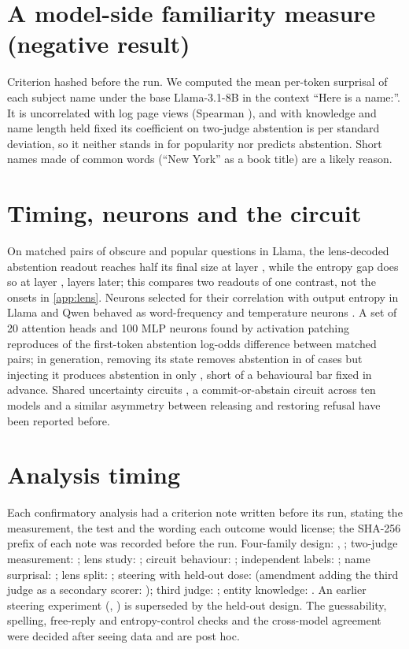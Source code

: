 \documentclass{article}
\begin{document}
\section{A model-side familiarity measure (negative result)}
\label{app:surprisal}

Criterion hashed before the run. We computed the mean per-token surprisal of each subject name under the base Llama-3.1-8B in the context ``Here is a name:''. It is uncorrelated with log page views (Spearman \esRho), and with knowledge and name length held fixed its coefficient on two-judge abstention is \esJudge{} \esJudgeCI{} per standard deviation, so it neither stands in for popularity nor predicts abstention. Short names made of common words (``New York'' as a book title) are a likely reason.

\section{Timing, neurons and the circuit}
\label{app:circuit}

On matched pairs of obscure and popular questions in Llama, the lens-decoded abstention readout reaches half its final size at layer \ltHedgeHalf, while the entropy gap does so at layer \ltEntHalf, \ltLead{} layers later; this compares two readouts of one contrast, not the onsets in \cref{app:lens}. Neurons selected for their correlation with output entropy in Llama and Qwen behaved as word-frequency and temperature neurons \citep{stolfo2024confidence,gurnee2024universal}. A set of 20 attention heads and 100 MLP neurons found by activation patching \citep{wang2023ioi,syed2023attribution} reproduces \ciRecovery{} \ciRecoveryCI{} of the first-token abstention log-odds difference between matched pairs; in generation, removing its state removes abstention in \ciRemoveFlip{} of cases but injecting it produces abstention in only \ciInjectFlip, short of a behavioural bar fixed in advance. Shared uncertainty circuits \citep{teplica2025sciurus}, a commit-or-abstain circuit across ten models \citep{nguyen2026commit} and a similar asymmetry between releasing and restoring refusal \citep{liu2026broken} have been reported before.

\section{Analysis timing}
\label{app:timing}

Each confirmatory analysis had a criterion note written before its run, stating the measurement, the test and the wording each outcome would license; the SHA-256 prefix of each note was recorded before the run. Four-family design: \hashQwenFactorial, \hashGemmaMistralFactorial; two-judge measurement: \hashHedgeMeasure; lens study: \hashLens; circuit behaviour: \hashCircuit; independent labels: \hashEOne; name surprisal: \hashETwo; lens split: \hashEThree; steering with held-out dose: \hashEFour{} (amendment adding the third judge as a secondary scorer: \hashEFourA); third judge: \hashEFive; entity knowledge: \hashESix. An earlier steering experiment (\hashSteering, \hashNoHedge) is superseded by the held-out design. The guessability, spelling, free-reply and entropy-control checks and the cross-model agreement were decided after seeing data and are post hoc.
\end{document}
